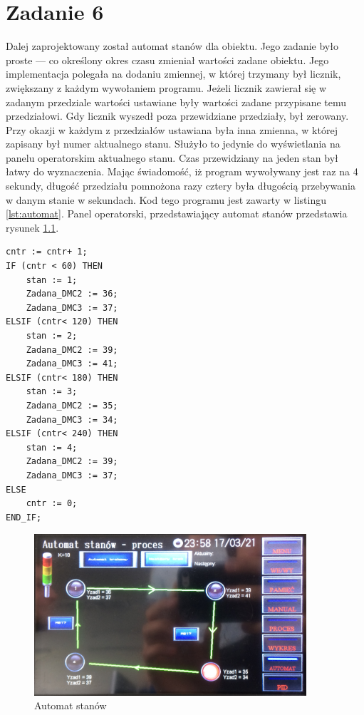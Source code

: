\chapter{Zadanie 6}
Dalej zaprojektowany został automat stanów dla obiektu. Jego zadanie było proste ---
co określony okres czasu zmieniał wartości zadane obiektu. Jego implementacja
polegała na dodaniu zmiennej, w której trzymany był licznik, zwiększany z
każdym wywołaniem programu. Jeżeli licznik zawierał się w zadanym przedziale
wartości ustawiane były wartości zadane przypisane temu przedziałowi. Gdy
licznik wyszedł poza przewidziane przedziały, był zerowany. Przy okazji
w każdym z przedziałów ustawiana była inna zmienna, w której zapisany
był numer aktualnego stanu. Służyło to jedynie do wyświetlania na panelu
operatorskim aktualnego stanu. Czas przewidziany na jeden stan był łatwy do
wyznaczenia. Mając świadomość, iż program wywoływany jest raz na 4 sekundy,
długość przedziału pomnożona razy cztery była długością przebywania w danym
stanie w sekundach. Kod tego programu jest zawarty w listingu \ref{lst:automat}.
Panel operatorski, przedstawiający automat stanów przedstawia rysunek \ref{pic:automat}.

\begin{lstlisting}[style=customlatex,frame=single, caption=Kod automatu stanów, label=lst:automat]
cntr := cntr+ 1;
IF (cntr < 60) THEN
	stan := 1;
	Zadana_DMC2 := 36;
	Zadana_DMC3 := 37;
ELSIF (cntr< 120) THEN
	stan := 2;
	Zadana_DMC2 := 39;
	Zadana_DMC3 := 41;
ELSIF (cntr< 180) THEN
	stan := 3;
	Zadana_DMC2 := 35;
	Zadana_DMC3 := 34;
ELSIF (cntr< 240) THEN
	stan := 4;
	Zadana_DMC2 := 39;
	Zadana_DMC3 := 37;
ELSE
	cntr := 0;
END_IF;
\end{lstlisting}

\begin{figure}[tb]
  \centering
  \includegraphics[width=0.9\textwidth]{Pictures/automat.jpg}
  \caption{Automat stanów}
  \label{pic:automat}
\end{figure}
